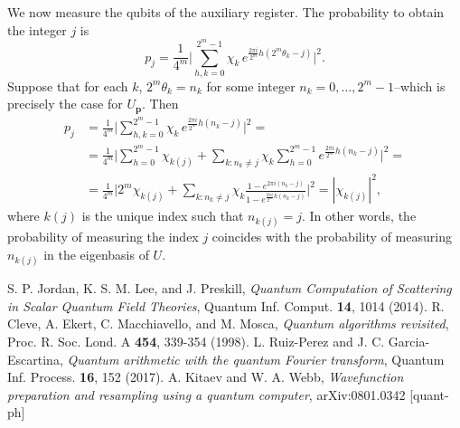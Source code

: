 \documentclass[a4paper,10pt]{report}
\begin{document}
We now measure the qubits of the auxiliary register. The probability to obtain the integer $j$ is
\begin{equation}
p_j = \frac{1}{4^m}\Big|\sum_{h,k=0}^{2^m-1}\chi_k\,e^{\frac{2\pi i}{2^m}h(2^m\theta_k-j)}\Big|^2.
\end{equation}
Suppose that for each $k$, $2^m\theta_k = n_k$ for some integer $n_k=0,\dots,2^m-1$--which is precisely the case for $U_\mathbf{p}$. Then
\begin{align}
p_{j} &= \frac{1}{4^m}\Big|\sum_{h,k=0}^{2^m-1}\chi_k\,e^{\frac{2\pi i}{2^m}h(n_k-j)}\Big|^2 =  \nonumber\\
&= \frac{1}{4^m}\Big|\sum_{h=0}^{2^m-1}\chi_{k(j)} + \sum_{k:n_k\neq j}\chi_k\sum_{h=0}^{2^m-1}e^{\frac{2\pi i}{2^m}h(n_k-j)}\Big|^2 = \nonumber\\
&= \frac{1}{4^m}\bigg|2^m\chi_{k(j)} + \sum_{k:n_k\neq j}\chi_k\frac{1-e^{2\pi i(n_k-j)}}{1-e^{\frac{2\pi i}{2^m}h(n_k-j)}}\bigg|^2 = |\chi_{k(j)}|^2,
\end{align}
where $k(j)$ is the unique index such that $n_{k(j)}=j$. In other words, the probability of measuring the index $j$ coincides with the probability of measuring $n_{k(j)}$ in the eigenbasis of $U$.

\begin{thebibliography}{}
S. P. Jordan, K. S. M. Lee, and J. Preskill, \textit{Quantum Computation of Scattering in Scalar Quantum Field Theories}, 	Quantum Inf. Comput. \textbf{14}, 1014 (2014).
R. Cleve, A. Ekert, C. Macchiavello, and M. Mosca, \textit{Quantum algorithms revisited}, Proc. R. Soc. Lond. A \textbf{454}, 339-354 (1998).
L. Ruiz-Perez and J. C. Garcia-Escartina, \textit{Quantum arithmetic with the quantum Fourier transform}, Quantum Inf. Process. \textbf{16}, 152 (2017).
A. Kitaev and W. A. Webb, \textit{Wavefunction preparation and resampling using a quantum computer}, 	arXiv:0801.0342 [quant-ph]

\end{thebibliography}
\end{document}
